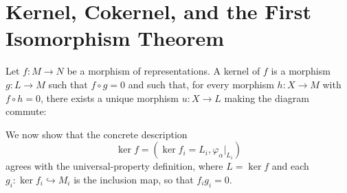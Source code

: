 \documentclass[11pt, a4paper]{report}
\begin{document}
\section{Kernel, Cokernel, and the First Isomorphism Theorem}

\begin{definition}
    Let $f:M\to N$ be a morphism of representations. A kernel of $f$ is a morphism
    $g:L\to M$ such that $f\circ g=0$ and such that, for every morphism $h:X\to M$
    with $f\circ h=0$, there exists a unique morphism $u:X\to L$ making the diagram
    commute:
    \begin{center}
    \end{center}
\end{definition}

We now show that the concrete description
\[
    \operatorname{ker}f=(\operatorname{ker}f_i=L_i,\varphi_{\alpha}|_{L_i})
\]
agrees with the universal-property definition, where $L=\operatorname{ker}f$ and each $g_i \colon \operatorname{ker}f_i \hookrightarrow M_i$ is the inclusion map, so that $f_i g_i = 0$.
\end{document}
